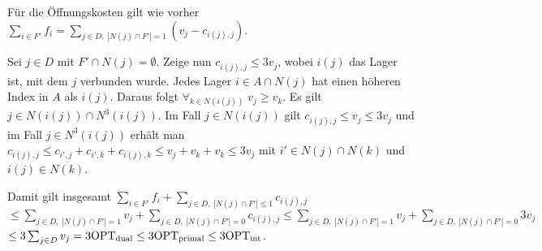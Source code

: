 \begin{Beweis}
    Für die Öffnungskosten gilt wie vorher
    $\sum_{i \in F'} f_i
    = \sum_{j \in D,\; |N(j) \cap F'| = 1} (v_j - c_{i(j),j})$.

    Sei $j \in D$ mit $F' \cap N(j) = \emptyset$.
    Zeige nun $c_{i(j),j} \le 3v_j$,
    wobei $i(j)$ das Lager ist, mit dem $j$ verbunden wurde.
    Jedes Lager $i \in A \cap N(j)$ hat einen höheren Index in $A$ als $i(j)$.
    Daraus folgt $\forall_{k \in N(i(j))}\; v_j \ge v_k$.
    Es gilt $j \in N(i(j)) \cap N^3(i(j))$.
    Im Fall $j \in N(i(j))$ gilt $c_{i(j),j} \le v_j \le 3v_j$ und im Fall
    $j \in N^3(i(j))$ erhält man
    $c_{i(j),j} \le c_{i',j} + c_{i',k} + c_{i(j),k} \le v_j + v_k + v_k \le 3v_j$
    mit $i' \in N(j) \cap N(k)$ und $i(j) \in N(k)$.

    Damit gilt insgesamt
    $\sum_{i \in F'} f_i + \sum_{j \in D,\; |N(j) \cap F'| \le 1} c_{i(j),j}$\\
    $\le \sum_{j \in D,\; |N(j) \cap F'| = 1} v_j
    + \sum_{j \in D,\; |N(j) \cap F'| = 0} c_{i(j),j}
    \le \sum_{j \in D,\; |N(j) \cap F'| = 1} v_j
    + \sum_{j \in D,\; |N(j) \cap F'| = 0} 3v_j$\\
    $\le 3\sum_{j \in D} v_j
    = 3\text{OPT}_\text{dual} \le 3\text{OPT}_\text{primal} \le 3\text{OPT}_\text{int}$.
\end{Beweis}

\pagebreak
